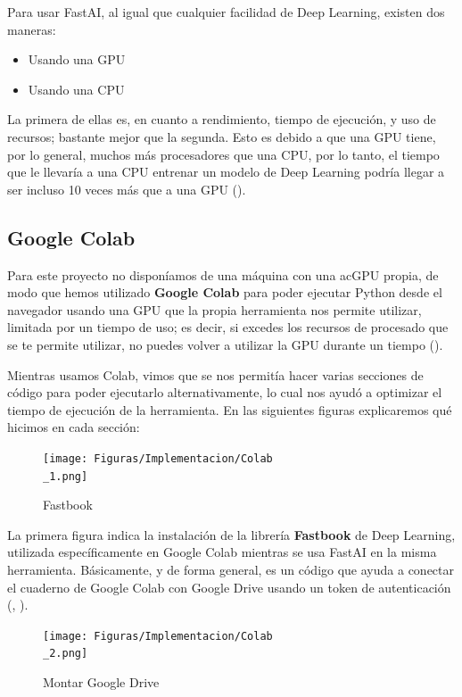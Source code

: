 Para usar FastAI, al igual que cualquier facilidad de Deep Learning, existen dos maneras:

\begin{itemize}
\item Usando una \ac{GPU}
\item Usando una \ac{CPU}
\end{itemize}

La primera de ellas es, en cuanto a rendimiento, tiempo de ejecución, y uso de recursos; bastante mejor que la segunda. Esto es debido a que una \ac{GPU} tiene, por lo general, muchos más procesadores que una \ac{CPU}, por lo tanto, el tiempo que le llevaría a una \ac{CPU} entrenar un modelo de Deep Learning podría llegar a ser incluso 10 veces más que a una \ac{GPU} (\cite{gpu-cpu}). %

\subsection{Google Colab}

Para este proyecto no disponíamos de una máquina con una ac{GPU} propia, de modo que hemos utilizado \textbf{Google Colab} para poder ejecutar Python desde el navegador usando una \ac{GPU} que la propia herramienta nos permite utilizar, limitada por un tiempo de uso; es decir, si excedes los recursos de procesado que se te permite utilizar, no puedes volver a utilizar la \ac{GPU} durante un tiempo (\cite{google-colab}). %

Mientras usamos Colab, vimos que se nos permitía hacer varias secciones de código para poder ejecutarlo alternativamente, lo cual nos ayudó a optimizar el tiempo de ejecución de la herramienta. En las siguientes figuras explicaremos qué hicimos en cada sección:

\begin{figure}[H]
  \centering
  \texttt{[image: Figuras/Implementacion/Colab\\\_1.png]}
  \label{fig:colab-1}
  \caption{Fastbook}
\end{figure}

La primera figura indica la instalación de la librería \textbf{Fastbook} de Deep Learning, utilizada específicamente en Google Colab mientras se usa FastAI en la misma herramienta. Básicamente, y de forma general, es un código que ayuda a conectar el cuaderno de Google Colab con Google Drive usando un token de autenticación (\cite{fastbook-1}, \cite{fastbook-2}). %

\begin{figure}[H]
  \centering
  \texttt{[image: Figuras/Implementacion/Colab\\\_2.png]}
  \label{fig:colab-2}
  \caption{Montar Google Drive}
\end{figure}

